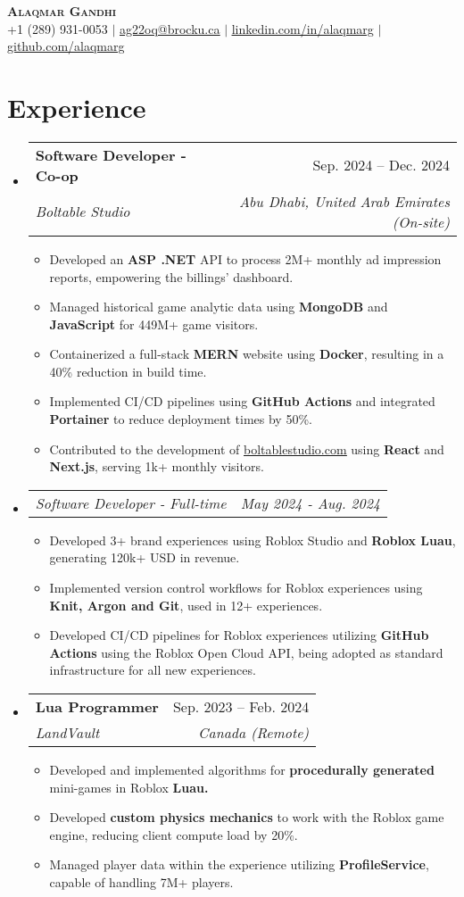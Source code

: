 \documentclass[letterpaper,11pt]{article}
\makeatletter
\newcommand{\resumeItem}[1]{
  \item\small{
    {#1 \vspace{-2pt}}
  }
}
\newcommand{\resumeSubheading}[4]{
  \vspace{-2pt}\item
    \begin{tabular*}{0.97\textwidth}[t]{l@{\extracolsep{\fill}}r}
      \textbf{#1} & #2 \\
      \textit{\small#3} & \textit{\small #4} \\
    \end{tabular*}\vspace{-7pt}
}
\newcommand{\resumeSubSubheading}[2]{
    \item
    \begin{tabular*}{0.97\textwidth}{l@{\extracolsep{\fill}}r}
      \textit{\small#1} & \textit{\small #2} \\
    \end{tabular*}\vspace{-7pt}
}
\newcommand{\resumeSubHeadingListStart}{\begin{itemize}[leftmargin=0.15in, label={}]}
\newcommand{\resumeSubHeadingListEnd}{\end{itemize}}
\newcommand{\resumeItemListStart}{\begin{itemize}}
\newcommand{\resumeItemListEnd}{\end{itemize}\vspace{-5pt}}
\makeatother
\begin{document}
\begin{center}
    \textbf{\Huge \scshape Alaqmar Gandhi} \\ \vspace{1pt}
    \small +1 (289) 931-0053 $|$ \href{mailto:ag22oq@brocku.ca}{\underline{ag22oq@brocku.ca}} $|$ 
    \href{https://linkedin.com/in/alaqmarg}{\underline{linkedin.com/in/alaqmarg}} $|$
    \href{https://github.com/alaqmarg}{\underline{github.com/alaqmarg}}
\end{center}

\section{Experience}
  \resumeSubHeadingListStart

    \resumeSubheading
      {Software Developer - Co-op}{Sep. 2024 -- Dec. 2024}
      {Boltable Studio}{Abu Dhabi, United Arab Emirates (On-site)}
      \resumeItemListStart
        \resumeItem{Developed an \textbf{ASP .NET} API to process 2M+ monthly ad impression reports, empowering the billings' dashboard.}
        \resumeItem{Managed historical game analytic data using \textbf{MongoDB} and \textbf{JavaScript} for 449M+ game visitors.}
        \resumeItem{Containerized a full-stack \textbf{MERN} website using \textbf{Docker}, resulting in a 40\% reduction in build time.}
        \resumeItem{Implemented CI/CD pipelines using \textbf{GitHub Actions} and integrated \textbf{Portainer} to reduce deployment times by 50\%.}
        \resumeItem{Contributed to the development of \href{https://boltablestudio.com}{\underline{boltablestudio.com}} using \textbf{React} and \textbf{Next.js}, serving 1k+ monthly visitors.}
      \resumeItemListEnd

    \resumeSubSubheading
    {Software Developer - Full-time}{May 2024 - Aug. 2024}
      \resumeItemListStart
        \resumeItem{Developed 3+ brand experiences using Roblox Studio and \textbf{Roblox Luau}, generating 120k+ USD in revenue.}
        \resumeItem{Implemented version control workflows for Roblox experiences using \textbf{Knit, Argon and Git}, used in 12+ experiences.}
        \resumeItem{Developed CI/CD pipelines for Roblox experiences utilizing \textbf{GitHub Actions} using the Roblox Open Cloud API, being adopted as standard infrastructure for all new experiences.}
      \resumeItemListEnd

    \resumeSubheading
      {Lua Programmer}{Sep. 2023 -- Feb. 2024}
      {LandVault}{Canada (Remote)}
      \resumeItemListStart
        \resumeItem{Developed and implemented algorithms for \textbf{procedurally generated} mini-games in Roblox \textbf{Luau.}}
        \resumeItem{Developed \textbf{custom physics mechanics} to work with the Roblox game engine, reducing client compute load by 20\%.}
        \resumeItem{Managed player data within the experience utilizing \textbf{ProfileService}, capable of handling 7M+ players.}
      \resumeItemListEnd
  \resumeSubHeadingListEnd
\end{document}
